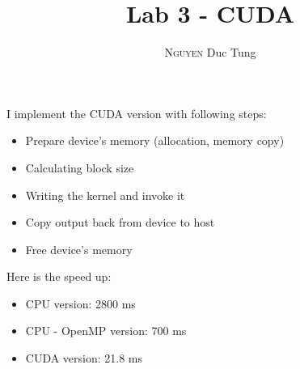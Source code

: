 \documentclass[12pt]{article}
\title{Lab 3 - CUDA}
\author{\textsc{Nguyen} Duc Tung}
\date{}
\begin{document}
\maketitle

I implement the CUDA version with following steps:

\begin{itemize}
  \item Prepare device's memory (allocation, memory copy)
  \item Calculating block size
  \item Writing the kernel and invoke it
  \item Copy output back from device to host
  \item Free device's memory
\end{itemize}

Here is the speed up:

\begin{itemize}
  \item CPU version: 2800 ms
  \item CPU - OpenMP version: 700 ms
  \item CUDA version: 21.8 ms
\end{itemize}
\end{document}
